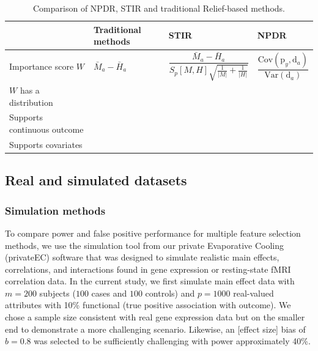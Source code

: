 \documentclass[10pt]{article}
\begin{document}
\begin{table}[h]

\begin{tabular}{p{4.5cm}C{2cm}C{3.2cm}C{2.7cm}}
                           & Traditional methods & STIR    & NPDR \\
\hline
Importance score $W$        & $\bar{M}_a - \bar{H}_a    $                      & $\dfrac{\bar{M}_a - \bar{H}_a }{S_p[M,H]\sqrt{\frac{1}{|M|}+\frac{1}{|H|}}}$ &   $\dfrac{\text{Cov}\left( \text{p}_y ,\text{d}_a  \right)}{\text{Var}\left( \text{d}_a  \right)}$ \\
$W$ has a distribution       &                                &      &   \\
Supports continuous outcome &                               &       &   \\
Supports covariates         &                                &       &  \\
\hline
\end{tabular}
\caption{Comparison of NPDR, STIR and traditional Relief-based methods.}
\label{tab:compare_npdr}
\end{table}



\subsection{Real and simulated datasets}
\subsubsection{Simulation methods}
To compare power and false positive performance for multiple feature selection methods, we use the simulation tool from our private Evaporative Cooling (privateEC) software \cite{le17} that was designed to simulate realistic main effects, correlations, and interactions found in gene expression or resting-state fMRI correlation data. In the current study, we first simulate main effect data with $m=200$ subjects ($100$ cases and $100$ controls) and $p=1000$ real-valued attributes with 10\% functional (true positive association with outcome).
We chose a sample size consistent with real gene expression data but on the smaller end to demonstrate a more challenging scenario.
Likewise, an [effect size] bias of $b=0.8$ was selected to be sufficiently challenging with power approximately 40\%. 
\end{document}
